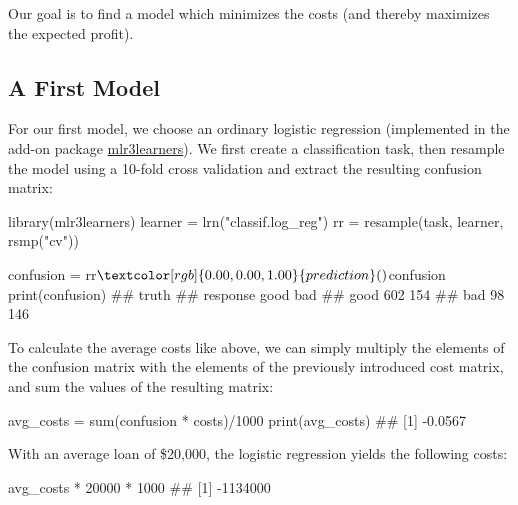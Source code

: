\documentclass[
  11pt,
  parskip=half,
  DIV=calc,
  BCOR=10mm,
  x11names]{scrbook}
\newenvironment{Shaded}{}{}
\newcommand{\DecValTok}[1]{#1}
\newcommand{\KeywordTok}[1]{\textcolor[rgb]{0.00,0.00,1.00}{#1}}
\newcommand{\NormalTok}[1]{#1}
\newcommand{\OperatorTok}[1]{#1}
\newcommand{\StringTok}[1]{\textcolor[rgb]{0.00,0.50,0.50}{#1}}
\begin{document}
Our goal is to find a model which minimizes the costs (and thereby maximizes the expected profit).

\hypertarget{a-first-model}{%
\subsection{A First Model}\label{a-first-model}}

For our first model, we choose an ordinary logistic regression (implemented in the add-on package \href{https://mlr3learners.mlr-org.com}{mlr3learners}).
We first create a classification task, then resample the model using a 10-fold cross validation and extract the resulting confusion matrix:

\begin{Shaded}
\begin{Highlighting}[]
\KeywordTok{library}\NormalTok{(mlr3learners)}
\NormalTok{learner =}\StringTok{ }\KeywordTok{lrn}\NormalTok{(}\StringTok{"classif.log_reg"}\NormalTok{)}
\NormalTok{rr =}\StringTok{ }\KeywordTok{resample}\NormalTok{(task, learner, }\KeywordTok{rsmp}\NormalTok{(}\StringTok{"cv"}\NormalTok{))}

\NormalTok{confusion =}\StringTok{ }\NormalTok{rr}\OperatorTok{$}\KeywordTok{prediction}\NormalTok{()}\OperatorTok{$}\NormalTok{confusion}
\KeywordTok{print}\NormalTok{(confusion)}
\NormalTok{##         truth}
\NormalTok{## response good bad}
\NormalTok{##     good  602 154}
\NormalTok{##     bad    98 146}
\end{Highlighting}
\end{Shaded}

To calculate the average costs like above, we can simply multiply the elements of the confusion matrix with the elements of the previously introduced cost matrix, and sum the values of the resulting matrix:

\begin{Shaded}
\begin{Highlighting}[]
\NormalTok{avg_costs =}\StringTok{ }\KeywordTok{sum}\NormalTok{(confusion }\OperatorTok{*}\StringTok{ }\NormalTok{costs)}\OperatorTok{/}\DecValTok{1000}
\KeywordTok{print}\NormalTok{(avg_costs)}
\NormalTok{## [1] -0.0567}
\end{Highlighting}
\end{Shaded}

With an average loan of \$20,000, the logistic regression yields the following costs:

\begin{Shaded}
\begin{Highlighting}[]
\NormalTok{avg_costs }\OperatorTok{*}\StringTok{ }\DecValTok{20000} \OperatorTok{*}\StringTok{ }\DecValTok{1000}
\NormalTok{## [1] -1134000}
\end{Highlighting}
\end{Shaded}
\end{document}
